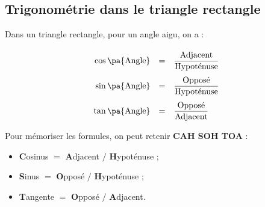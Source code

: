 \subsection{Trigonométrie dans le triangle rectangle}

\begin{prop}
	\nline
	\begin{wrapstuff}[r]
	\end{wrapstuff}
	Dans un triangle rectangle, pour un angle aigu, on a :
	\[
		\def\arraystretch{2.5}
		\begin{array}{rcl}
			\cos\pa{\text{Angle}} & = & \dfrac{\text{Adjacent}}{\text{Hypoténuse}} \\
			\sin\pa{\text{Angle}} & = & \dfrac{\text{Opposé}}{\text{Hypoténuse}}   \\
			\tan\pa{\text{Angle}} & = & \dfrac{\text{Opposé}}{\text{Adjacent}}
		\end{array}
	\]

\end{prop}

\begin{rem}
	Pour mémoriser les formules, on peut retenir \textbf{CAH SOH TOA} :

	\begin{itemize}
		\item \textbf{C}osinus $=$ \textbf{A}djacent $/$ \textbf{H}ypoténuse ;
		\item \textbf{S}inus $=$ \textbf{O}pposé $/$ \textbf{H}ypoténuse ;
		\item \textbf{T}angente $=$ \textbf{O}pposé $/$ \textbf{A}djacent.
	\end{itemize}
\end{rem}

